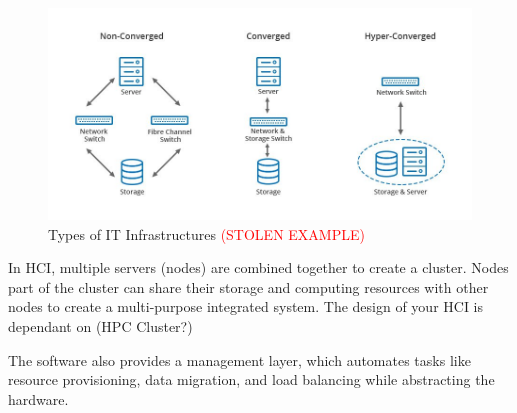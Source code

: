 \begin{figure}[H]
    \centering
    \includegraphics[scale = 0.5]{images/HCI_tldr.jpg}
    \caption{Types of IT Infrastructures \textcolor{red}{(STOLEN EXAMPLE)}}
    \label{HCI Convergance Comparison}
\end{figure}

In HCI, multiple servers (nodes) are combined together to create a cluster. Nodes part of the cluster can share their storage and computing resources with other nodes to create a multi-purpose integrated system. The design of your HCI is dependant on (HPC Cluster?)

The software also provides a management layer, which automates tasks like resource provisioning, data migration, and load balancing while abstracting the hardware. 
